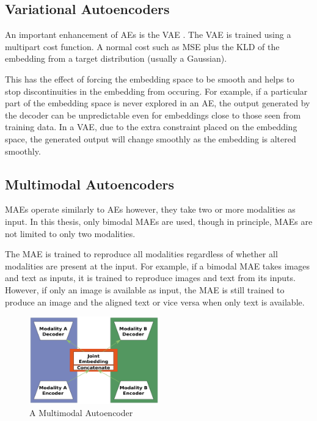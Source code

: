 \subsection{Variational Autoencoders}
An important enhancement of \ac{AE}s is the \ac{VAE} \cite{kingma2013auto}. The \ac{VAE} is trained using a multipart cost function. A normal cost such as \ac{MSE} plus the \ac{KLD} of the embedding from a target distribution (usually a Gaussian).

This has the effect of forcing the embedding space to be smooth and helps to stop discontinuities in the embedding from occuring. For example, if a particular part of the embedding space is never explored in an \ac{AE}, the output generated by the decoder can be unpredictable even for embeddings close to those seen from training data. In a \ac{VAE}, due to the extra constraint placed on the embedding space, the generated output will change smoothly as the embedding is altered smoothly.


\subsection{Multimodal Autoencoders}
\acp{MAE} operate similarly to \ac{AE}s however, they take two or more modalities as input. In this thesis, only bimodal \acp{MAE} are used, though in principle, \acp{MAE} are not limited to only two modalities.

The \ac{MAE} is trained to reproduce all modalities regardless of whether all modalities are present at the input. For example, if a bimodal \ac{MAE} takes images and text as inputs, it is trained to reproduce images and text from its inputs. However, if only an image is available as input, the \ac{MAE} is still trained to produce an image and the aligned text or vice versa when only text is available.


\begin{figure}
	\centering
	\includegraphics[width=0.5\textwidth]{Figs/intro2dl/MAE.png}
	
	\caption{A Multimodal Autoencoder}
	\label{fig:mae}
\end{figure}

